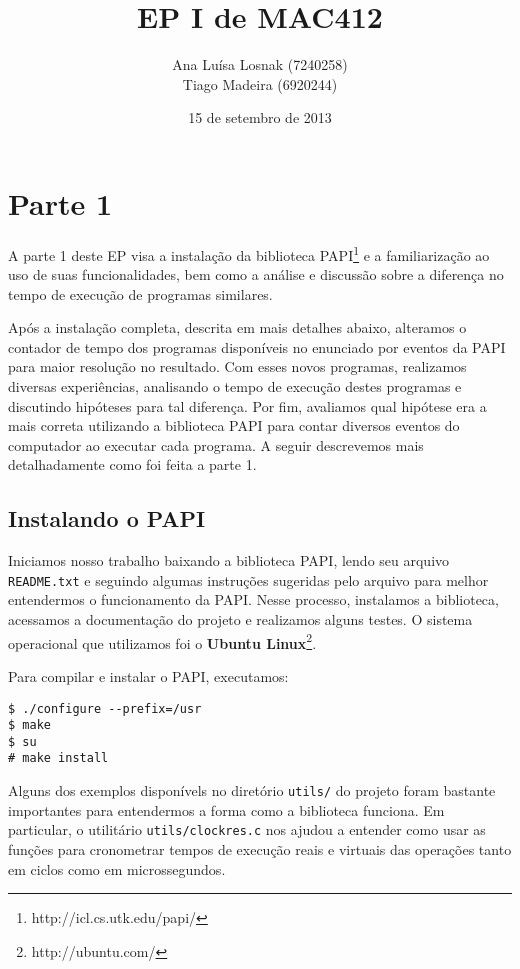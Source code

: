 \documentclass[a4paper,oneside,12pt]{article}
\title{EP I de MAC412}
\author{Ana Luísa Losnak (7240258)\\
        Tiago Madeira (6920244)}
\date{15 de setembro de 2013}
\begin{document}
\maketitle
\tableofcontents
\newpage

\section{Parte 1}

A parte 1 deste EP visa a instalação da biblioteca PAPI\footnote{http://icl.cs.utk.edu/papi/} e a familiarização ao uso de suas funcionalidades, bem como a análise e discussão sobre a diferença no tempo de execução de programas similares. 

Após a instalação completa, descrita em mais detalhes abaixo, alteramos o contador de tempo dos programas disponíveis no enunciado por eventos da PAPI para maior resolução no resultado. Com esses novos programas, realizamos diversas experiências, analisando o tempo de execução destes programas e discutindo hipóteses para tal diferença. Por fim, avaliamos qual hipótese era a mais correta utilizando a biblioteca PAPI para contar diversos eventos do computador ao executar cada programa. A seguir descrevemos mais detalhadamente como foi feita a parte 1.

\subsection{Instalando o PAPI}

Iniciamos nosso trabalho baixando a biblioteca PAPI, lendo seu arquivo {\tt README.txt} e seguindo algumas instruções sugeridas pelo arquivo para melhor entendermos o funcionamento da PAPI. Nesse processo, instalamos a biblioteca, acessamos a documentação do projeto e realizamos alguns testes. O sistema operacional que utilizamos foi o \textbf{Ubuntu Linux}\footnote{http://ubuntu.com/}.

Para compilar e instalar o PAPI, executamos:

\begin{verbatim}
$ ./configure --prefix=/usr
$ make
$ su
# make install
\end{verbatim}

Alguns dos exemplos disponívels no diretório {\tt utils/} do projeto foram bastante importantes para entendermos a forma como a biblioteca funciona. Em particular, o utilitário {\tt utils/clockres.c} nos ajudou a entender como usar as funções para cronometrar tempos de execução reais e virtuais das operações tanto em ciclos como em microssegundos.
\end{document}
